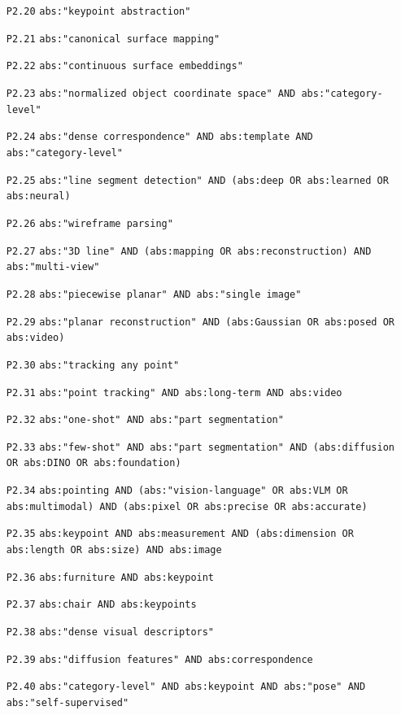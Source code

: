 {\begin{itemize}
\item[\texttt{P2.20}] \texttt{abs:"keypoint abstraction"}
\item[\texttt{P2.21}] \texttt{abs:"canonical surface mapping"}
\item[\texttt{P2.22}] \texttt{abs:"continuous surface embeddings"}
\item[\texttt{P2.23}] \texttt{abs:"normalized object coordinate space" AND abs:"category-level"}
\item[\texttt{P2.24}] \texttt{abs:"dense correspondence" AND abs:template AND abs:"category-level"}
\item[\texttt{P2.25}] \texttt{abs:"line segment detection" AND (abs:deep OR abs:learned OR abs:neural)}
\item[\texttt{P2.26}] \texttt{abs:"wireframe parsing"}
\item[\texttt{P2.27}] \texttt{abs:"3D line" AND (abs:mapping OR abs:reconstruction) AND abs:"multi-view"}
\item[\texttt{P2.28}] \texttt{abs:"piecewise planar" AND abs:"single image"}
\item[\texttt{P2.29}] \texttt{abs:"planar reconstruction" AND (abs:Gaussian OR abs:posed OR abs:video)}
\item[\texttt{P2.30}] \texttt{abs:"tracking any point"}
\item[\texttt{P2.31}] \texttt{abs:"point tracking" AND abs:long-term AND abs:video}
\item[\texttt{P2.32}] \texttt{abs:"one-shot" AND abs:"part segmentation"}
\item[\texttt{P2.33}] \texttt{abs:"few-shot" AND abs:"part segmentation" AND (abs:diffusion OR abs:DINO OR abs:foundation)}
\item[\texttt{P2.34}] \texttt{abs:pointing AND (abs:"vision-language" OR abs:VLM OR abs:multimodal) AND (abs:pixel OR abs:precise OR abs:accurate)}
\item[\texttt{P2.35}] \texttt{abs:keypoint AND abs:measurement AND (abs:dimension OR abs:length OR abs:size) AND abs:image}
\item[\texttt{P2.36}] \texttt{abs:furniture AND abs:keypoint}
\item[\texttt{P2.37}] \texttt{abs:chair AND abs:keypoints}
\item[\texttt{P2.38}] \texttt{abs:"dense visual descriptors"}
\item[\texttt{P2.39}] \texttt{abs:"diffusion features" AND abs:correspondence}
\item[\texttt{P2.40}] \texttt{abs:"category-level" AND abs:keypoint AND abs:"pose" AND abs:"self-supervised"}

\end{itemize}}
